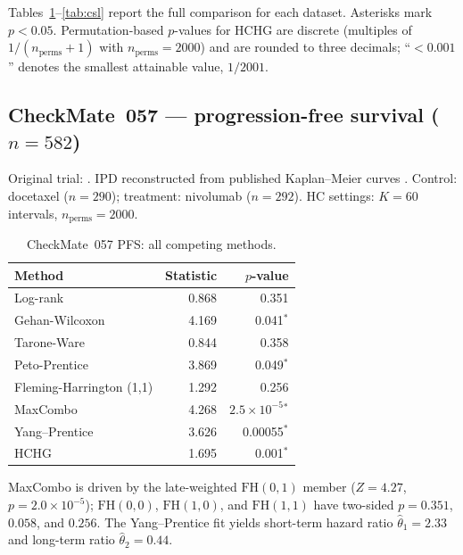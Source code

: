 \documentclass[11pt]{article}
\newcommand{\sig}{$^{\ast}$}
\begin{document}
Tables~\ref{tab:checkmate}--\ref{tab:csl} report the full comparison
for each dataset.  Asterisks mark $p < 0.05$.
Permutation-based $p$-values for HCHG are discrete
(multiples of $1/(n_\mathrm{perms}+1)$ with $n_\mathrm{perms}=2000$) and
are rounded to three decimals; ``$<0.001$'' denotes the smallest
attainable value, $1/2001$.

\subsection*{CheckMate~057 --- progression-free survival ($n=582$)}

Original trial: \citet{borghaei2015}.
IPD reconstructed from published Kaplan--Meier curves
\citep{guyot2012}.
Control: docetaxel ($n=290$); treatment: nivolumab ($n=292$).
HC settings: $K=60$ intervals, $n_\mathrm{perms}=2000$.

\begin{table}[h]
  \centering
  \caption{CheckMate~057 PFS: all competing methods.}
  \label{tab:checkmate}
  \begin{tabular}{@{}lrr@{}}
    \toprule
    Method & Statistic & $p$-value \\
    \midrule
    Log-rank                         &  0.868 & 0.351 \\
    Gehan-Wilcoxon                   &  4.169 & 0.041\sig \\
    Tarone-Ware                      &  0.844 & 0.358 \\
    Peto-Prentice                    &  3.869 & 0.049\sig \\
    Fleming-Harrington (1,1)         &  1.292 & 0.256 \\
    MaxCombo                         &  4.268 & $2.5\times 10^{-5}$\sig \\
    Yang--Prentice                   &  3.626 & 0.00055\sig \\
    HCHG                             &  1.695 & 0.001\sig \\
    \bottomrule
  \end{tabular}
\end{table}

\noindent
MaxCombo is driven by the late-weighted $\mathrm{FH}(0,1)$ member
($Z=4.27$, $p=2.0\times 10^{-5}$); $\mathrm{FH}(0,0)$, $\mathrm{FH}(1,0)$,
and $\mathrm{FH}(1,1)$ have two-sided $p=0.351$, $0.058$, and $0.256$.
The Yang--Prentice fit yields short-term hazard ratio
$\hat\theta_1=2.33$ and long-term ratio $\hat\theta_2=0.44$.
\end{document}
